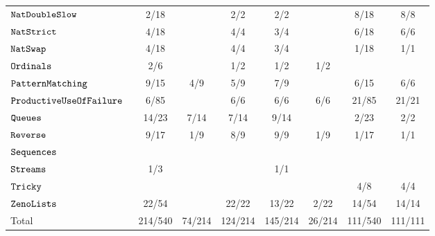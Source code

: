 \begin{tabular}{>{\footnotesize}l || >{\footnotesize}c | >{\footnotesize}c | >{\footnotesize}c | >{\footnotesize}c | >{\footnotesize}c || >{\footnotesize}c | >{\footnotesize}c}
$\ts{NatDoubleSlow           }$   & 2/18 &  & 2/2 & 2/2 &  & 8/18 & 8/8\\
$\ts{NatStrict               }$   & 4/18 &  & 4/4 & 3/4 &  & 6/18 & 6/6\\
$\ts{NatSwap                 }$   & 4/18 &  & 4/4 & 3/4 &  & 1/18 & 1/1\\
$\ts{Ordinals                }$   & 2/6 &  & 1/2 & 1/2 & 1/2 &  & \\
$\ts{PatternMatching         }$   & 9/15 & 4/9 & 5/9 & 7/9 &  & 6/15 & 6/6\\
$\ts{ProductiveUseOfFailure  }$   & 6/85 &  & 6/6 & 6/6 & 6/6 & 21/85 & 21/21\\
$\ts{Queues                  }$   & 14/23 & 7/14 & 7/14 & 9/14 &  & 2/23 & 2/2\\
$\ts{Reverse                 }$   & 9/17 & 1/9 & 8/9 & 9/9 & 1/9 & 1/17 & 1/1\\
$\ts{Sequences               }$   &  &  &  &  &  &  & \\
$\ts{Streams                 }$   & 1/3 &  &  & 1/1 &  &  & \\
$\ts{Tricky                  }$   &  &  &  &  &  & 4/8 & 4/4\\
$\ts{ZenoLists               }$   & 22/54 &  & 22/22 & 13/22 & 2/22 & 14/54 & 14/14\\
\hline
Total                      & 214/540 & 74/214 & 124/214 & 145/214 & 26/214 & 111/540 & 111/111\\
\end{tabular}
%
